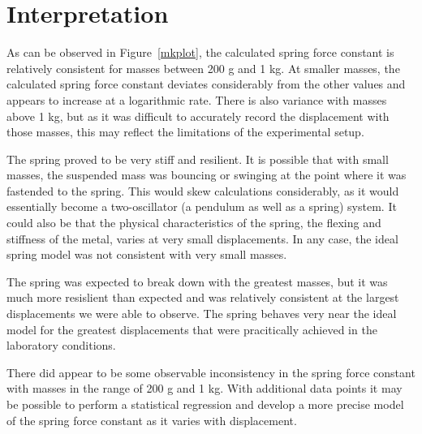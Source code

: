 \documentclass{article}
\numberwithin{figure}{section}
\numberwithin{table}{section}
\begin{document}
\FloatBarrier 

\section{Interpretation} 

As can be observed in Figure~\ref{mkplot}, the calculated spring force constant is relatively consistent for masses between 200 g and 1 kg.  At smaller masses, the calculated spring force constant deviates considerably from the other values and appears to increase at a logarithmic rate.  There is also variance with masses above 1 kg, but as it was difficult to accurately record the displacement with those masses, this may reflect the limitations of the experimental setup.

The spring proved to be very stiff and resilient.  It is possible that with small masses, the suspended mass was bouncing or swinging at the point where it was fastended to the spring.  This would skew calculations considerably, as it would essentially become a two-oscillator (a pendulum as well as a spring) system.  It could also be that the physical characteristics of the spring, the flexing and stiffness of the metal, varies at very small displacements.  In any case, the ideal spring model was not consistent with very small masses.

The spring was expected to break down with the greatest masses, but it was much more resislient than expected and was relatively consistent at the largest displacements we were able to observe.  The spring behaves very near the ideal model for the greatest displacements that were pracitically achieved in the laboratory conditions.

There did appear to be some observable inconsistency in the spring force constant with masses in the range of 200 g and 1 kg.  With additional data points it may be possible to perform a statistical regression and develop a more precise model of the spring force constant as it varies with displacement.
\end{document}
